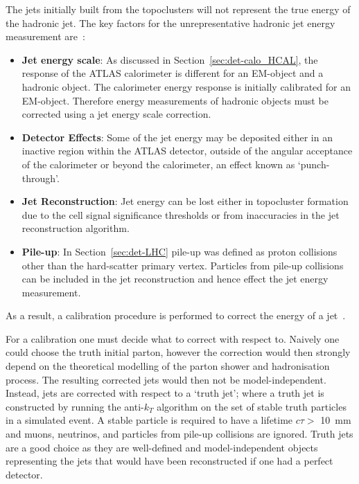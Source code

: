 The jets initially built from the topoclusters will not represent the true energy of the hadronic jet.
The key factors for the unrepresentative hadronic jet energy measurement are~\cite{det-thesis_kate,obj-jets_calib_2015}:
\begin{itemize}[leftmargin=*]
\item\textbf{Jet energy scale}:
  As discussed in Section~\ref{sec:det-calo_HCAL}, the response of the ATLAS calorimeter is different for an EM-object and a hadronic object.
  The calorimeter energy response is initially calibrated for an EM-object.
  Therefore energy measurements of hadronic objects must be corrected using a jet energy scale correction. \vspace{0.5em}
\item\textbf{Detector Effects}:
  Some of the jet energy may be deposited either in an inactive region within the ATLAS detector,
  outside of the angular acceptance of the calorimeter or beyond the calorimeter, an effect known as `punch-through'.\vspace{0.5em}
\item\textbf{Jet Reconstruction}:
  Jet energy can be lost either in topocluster formation due to the cell signal significance thresholds
  or from inaccuracies in the jet reconstruction algorithm.\vspace{0.5em}
\item\textbf{Pile-up}:
  In Section~\ref{sec:det-LHC} pile-up was defined as proton collisions other than the hard-scatter primary vertex.
  Particles from pile-up collisions can be included in the jet reconstruction and hence effect the jet energy measurement.
\end{itemize}
\vspace{-0.5em}
As a result, a calibration procedure is performed to correct the energy of a jet~\cite{obj-jets_calib_run2}.

For a calibration one must decide what to correct with respect to.
Naively one could choose the truth initial parton,
however the correction would then strongly depend on the theoretical modelling of the parton shower and hadronisation process.
The resulting corrected jets would then not be model-independent.
Instead, jets are corrected with respect to a `truth jet';
where a truth jet is constructed by running the anti-$k_T$ algorithm on the set of stable truth particles in a simulated event.
A stable particle is required to have a lifetime $c\tau >$ \SI{10}{\milli\metre} and muons, neutrinos, and particles from pile-up collisions are ignored.
Truth jets are a good choice as they are well-defined and model-independent objects representing the jets that would have been reconstructed if one had a perfect detector.

